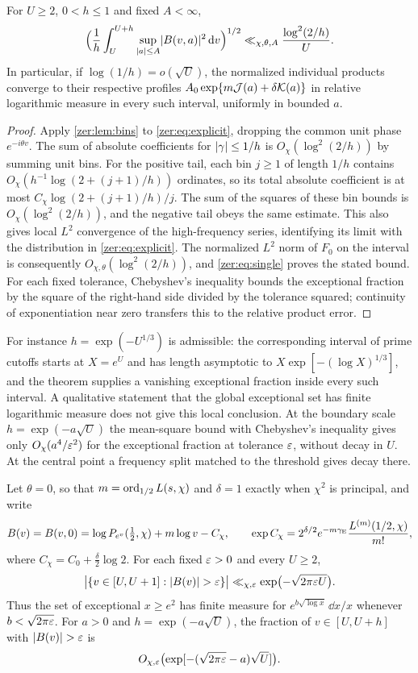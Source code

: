 \begin{theorem}\label{zer:thm:ms}
For $U\ge2$, $0<h\le1$ and fixed $A<\infty$,
\[
 \Bigl(\frac1h\int_U^{U+h}\sup_{\abs a\le A}\abs{B(v,a)}^2\,\dd v\Bigr)^{1/2}
 \ll_{\chi,\theta,A}\frac{\log^2(2/h)}U .
\]
In particular, if $\log(1/h)=o(\sqrt U)$, the normalized individual products converge to
their respective profiles $A_0\exp\{m\zerJ(a)+\delta\zerK(a)\}$ in relative logarithmic
measure in every such interval, uniformly in bounded $a$.
\end{theorem}
\begin{proof}
Apply \cref{zer:lem:bins} to \eqref{zer:eq:explicit}, dropping the common unit phase
$e^{-i\theta v}$. The sum of absolute coefficients for $\abs\gamma\le1/h$ is
$O_\chi(\log^2(2/h))$ by summing unit bins. For the positive tail, each bin $j\ge1$ of length
$1/h$ contains $O_\chi(h^{-1}\log(2+(j+1)/h))$ ordinates, so its total absolute coefficient
is at most $C_\chi\log(2+(j+1)/h)/j$. The sum of the squares of these bin bounds is
$O_\chi(\log^2(2/h))$, and the negative tail obeys the same estimate. This also gives local
$L^2$ convergence of the high-frequency series, identifying its limit with the distribution
in \eqref{zer:eq:explicit}. The normalized $L^2$ norm of $F_0$ on the interval is
consequently $O_{\chi,\theta}(\log^2(2/h))$, and \eqref{zer:eq:single} proves the stated
bound. For each fixed tolerance, Chebyshev's inequality bounds the exceptional fraction by
the square of the right-hand side divided by the tolerance squared; continuity of
exponentiation near zero transfers this to the relative product error.
\end{proof}

For instance $h=\exp(-U^{1/3})$ is admissible: the corresponding interval of prime cutoffs
starts at $X=e^U$ and has length asymptotic to $X\exp[-(\log X)^{1/3}]$, and the theorem
supplies a vanishing exceptional fraction inside every such interval. A qualitative statement
that the global exceptional set has finite logarithmic measure does not give this local
conclusion. At the boundary scale $h=\exp(-a\sqrt U)$ the mean-square bound with Chebyshev's
inequality gives only $O_\chi(a^4/\eps^2)$ for the exceptional fraction at tolerance $\eps$,
without decay in $U$. At the central point a frequency split matched to the threshold gives
decay there.

\begin{theorem}\label{zer:thm:exceptional}
Let $\theta=0$, so that $m=\ord_{1/2}L(s,\chi)$ and $\delta=1$ exactly when $\chi^2$ is
principal, and write
\[
 B(v)=B(v,0)=\log P_{e^v}(\tfrac12,\chi)+m\log v-C_\chi,\qquad
 \exp C_\chi=2^{\delta/2}e^{-m\zergE}\frac{L^{(m)}(1/2,\chi)}{m!},
\]
where $C_\chi=C_0+\tfrac\delta2\log2$. For each fixed $\eps>0$ and every $U\ge2$,
\[
 \abs[\big]{\set{v\in[U,U+1]:\abs{B(v)}>\eps}}\ll_{\chi,\eps}\exp\bigl(-\sqrt{2\pi\eps U}\bigr).
\]
Thus the set of exceptional $x\ge e^2$ has finite measure for
$e^{b\sqrt{\log x}}\,\dd x/x$ whenever $b<\sqrt{2\pi\eps}$. For $a>0$ and
$h=\exp(-a\sqrt U)$, the fraction of $v\in[U,U+h]$ with $\abs{B(v)}>\eps$ is
\[
 O_{\chi,\eps}\bigl(\exp[-(\sqrt{2\pi\eps}-a)\sqrt U]\bigr).
\]
\end{theorem}

